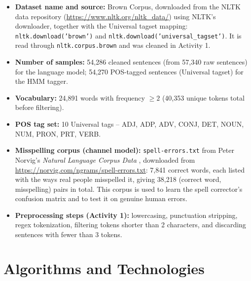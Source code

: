 \documentclass[12pt,a4paper]{report}
\begin{document}
\begin{itemize}
    \item \textbf{Dataset name and source:} Brown Corpus, downloaded
    from the NLTK data repository (\url{https://www.nltk.org/nltk_data/})
    using NLTK's downloader, together with the Universal tagset mapping:
    \texttt{nltk.download('brown')} and
    \texttt{nltk.download('universal\_tagset')}. It is read through
    \texttt{nltk.corpus.brown} and was cleaned in Activity 1.
    \item \textbf{Number of samples:} 54,286 cleaned sentences (from
    57,340 raw sentences) for the language model; 54,270 POS-tagged
    sentences (Universal tagset) for the HMM tagger.
    \item \textbf{Vocabulary:} 24,891 words with frequency $\geq 2$
    (40,353 unique tokens total before filtering).
    \item \textbf{POS tag set:} 10 Universal tags -- ADJ, ADP, ADV, CONJ,
    DET, NOUN, NUM, PRON, PRT, VERB.
    \item \textbf{Misspelling corpus (channel model):}
    \texttt{spell-errors.txt} from Peter Norvig's \emph{Natural Language
    Corpus Data} \cite{norvig2009}, downloaded from
    \url{https://norvig.com/ngrams/spell-errors.txt}: 7,841 correct words, each listed with
    the ways real people misspelled it, giving 38,218
    (correct word, misspelling) pairs in total. This corpus is used to
    learn the spell corrector's confusion matrix and to test it on
    genuine human errors.
    \item \textbf{Preprocessing steps (Activity 1):} lowercasing,
    punctuation stripping, regex tokenization, filtering tokens shorter
    than 2 characters, and discarding sentences with fewer than 3 tokens.
\end{itemize}

\section{Algorithms and Technologies}
\end{document}
